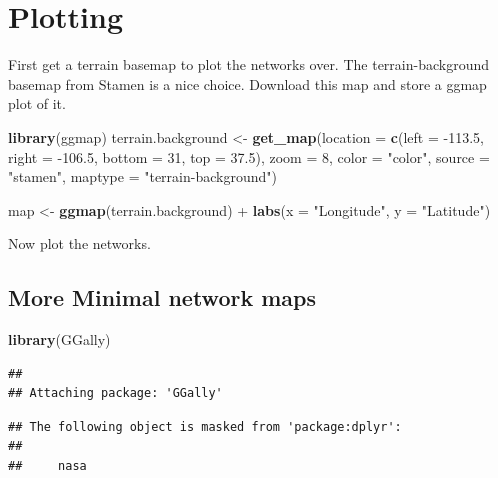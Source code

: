 \documentclass[]{article}
\newenvironment{Shaded}{\begin{snugshade}}{\end{snugshade}}
\newcommand{\KeywordTok}[1]{\textcolor[rgb]{0.13,0.29,0.53}{\textbf{{#1}}}}
\newcommand{\DataTypeTok}[1]{\textcolor[rgb]{0.13,0.29,0.53}{{#1}}}
\newcommand{\DecValTok}[1]{\textcolor[rgb]{0.00,0.00,0.81}{{#1}}}
\newcommand{\FloatTok}[1]{\textcolor[rgb]{0.00,0.00,0.81}{{#1}}}
\newcommand{\StringTok}[1]{\textcolor[rgb]{0.31,0.60,0.02}{{#1}}}
\newcommand{\NormalTok}[1]{{#1}}
\begin{document}
\section{Plotting}\label{plotting}

First get a terrain basemap to plot the networks over. The
terrain-background basemap from Stamen is a nice choice. Download this
map and store a ggmap plot of it.

\begin{Shaded}
\begin{Highlighting}[]
\KeywordTok{library}\NormalTok{(ggmap)}
\NormalTok{terrain.background <-}\StringTok{ }\KeywordTok{get_map}\NormalTok{(}\DataTypeTok{location =} \KeywordTok{c}\NormalTok{(}\DataTypeTok{left =} \NormalTok{-}\FloatTok{113.5}\NormalTok{, }\DataTypeTok{right =} \NormalTok{-}\FloatTok{106.5}\NormalTok{, }\DataTypeTok{bottom =} \DecValTok{31}\NormalTok{, }\DataTypeTok{top =} \FloatTok{37.5}\NormalTok{),}
  \DataTypeTok{zoom =} \DecValTok{8}\NormalTok{,}
  \DataTypeTok{color =} \StringTok{"color"}\NormalTok{,}
  \DataTypeTok{source =} \StringTok{"stamen"}\NormalTok{,}
  \DataTypeTok{maptype =} \StringTok{"terrain-background"}\NormalTok{)}

\NormalTok{map <-}\StringTok{ }\KeywordTok{ggmap}\NormalTok{(terrain.background)  +}
\StringTok{  }\KeywordTok{labs}\NormalTok{(}\DataTypeTok{x =} \StringTok{"Longitude"}\NormalTok{, }\DataTypeTok{y =} \StringTok{"Latitude"}\NormalTok{)}
\end{Highlighting}
\end{Shaded}

Now plot the networks.

\subsection{More Minimal network maps}\label{more-minimal-network-maps}

\begin{Shaded}
\begin{Highlighting}[]
\KeywordTok{library}\NormalTok{(GGally)}
\end{Highlighting}
\end{Shaded}

\begin{verbatim}
## 
## Attaching package: 'GGally'
\end{verbatim}

\begin{verbatim}
## The following object is masked from 'package:dplyr':
## 
##     nasa
\end{verbatim}
\end{document}
